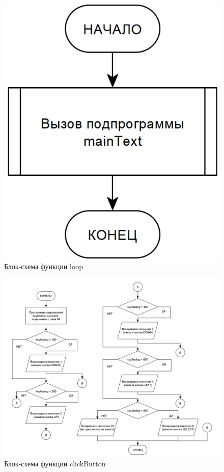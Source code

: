 \documentclass{altsu-report}
\begin{document}
\begin{figure}[H]
    \centering
    \includegraphics[scale=0.3]{loop.png}
    \caption{Блок-схема функции loop}
    \label{fig:loop}
\end{figure}

\begin{figure}[H]
    \centering
    \includegraphics[scale=0.8]{clickButton.png}
    \caption{Блок-схема функции clickButton}
    \label{fig:click}
\end{figure}
\end{document}
